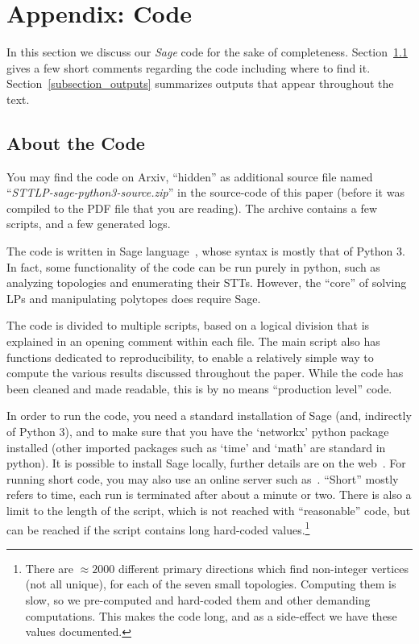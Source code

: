 \section{Appendix: Code}
\label{appendix_section_code}
In this section we discuss our \emph{Sage} code for the sake of completeness. Section~\ref{subsection_brief_code} gives a few short comments regarding the code including where to find it. Section~\ref{subsection_outputs} summarizes outputs that appear throughout the text.

\subsection{About the Code}
\label{subsection_brief_code}
You may find the code on Arxiv, ``hidden'' as additional source file named ``\emph{{STTLP-sage-python3-source.zip}}'' in the source-code of this paper (before it was compiled to the PDF file that you are reading). The archive contains a few scripts, and a few generated logs.

The code is written in Sage language~\cite{SageWebsite}, whose syntax is mostly that of Python 3. In fact, some functionality of the code can be run purely in python, such as analyzing topologies and enumerating their STTs. However, the ``core'' of solving LPs and manipulating polytopes does require Sage.

The code is divided to multiple scripts, based on a logical division that is explained in an opening comment within each file. The main script also has functions dedicated to reproducibility, to enable a relatively simple way to compute the various results discussed throughout the paper. While the code has been cleaned and made readable, this is by no means ``production level'' code.

In order to run the code, you need a standard installation of Sage (and, indirectly of Python 3), and to make sure that you have the `networkx' python package installed (other imported packages such as `time' and `math' are standard in python). It is possible to install Sage locally, further details are on the web~\cite{SageInstallation}.
For running short code, you may also use an online server such as~\cite{SageFreeServer}. ``Short'' mostly refers to time, each run is terminated after about a minute or two. There is also a limit to the length of the script, which is not reached with ``reasonable'' code, but can be reached if the script contains long hard-coded values.\footnote{There are $\approx 2000$ different primary directions which find non-integer vertices (not all unique), for each of the seven small topologies. Computing them is slow, so we pre-computed and hard-coded them and other demanding computations. This makes the code long, and as a side-effect we have these values documented.}




